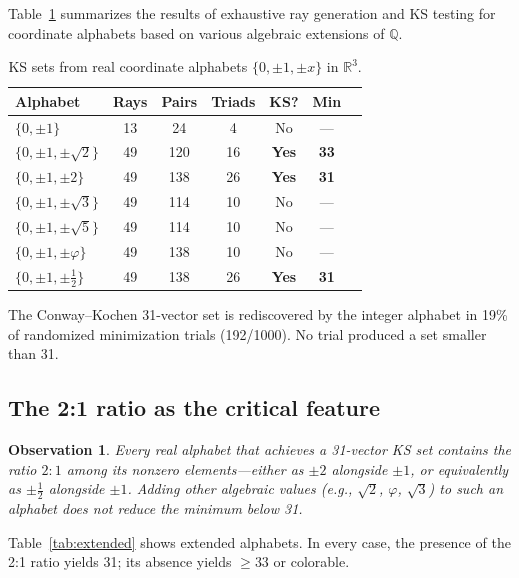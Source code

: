 \documentclass[12pt,a4paper]{article}
\newtheorem{observation}[theorem]{Observation}
\newcommand{\R}{\mathbb{R}}
\newcommand{\Q}{\mathbb{Q}}
\begin{document}
Table~\ref{tab:alphabets} summarizes the results of exhaustive ray generation and KS testing for coordinate alphabets based on various algebraic extensions of $\Q$.

\begin{table}[ht]
\centering
\caption{KS sets from real coordinate alphabets $\{0, \pm 1, \pm x\}$ in $\R^3$.}
\label{tab:alphabets}
\begin{tabular}{lcccccc}
\toprule
Alphabet & Rays & Pairs & Triads & KS? & Min \\
\midrule
$\{0, \pm 1\}$ & 13 & 24 & 4 & No & --- \\
$\{0, \pm 1, \pm\sqrt{2}\}$ & 49 & 120 & 16 & \textbf{Yes} & \textbf{33} \\
$\{0, \pm 1, \pm 2\}$ & 49 & 138 & 26 & \textbf{Yes} & \textbf{31} \\
$\{0, \pm 1, \pm\sqrt{3}\}$ & 49 & 114 & 10 & No & --- \\
$\{0, \pm 1, \pm\sqrt{5}\}$ & 49 & 114 & 10 & No & --- \\
$\{0, \pm 1, \pm\varphi\}$ & 49 & 138 & 10 & No & --- \\
$\{0, \pm 1, \pm\frac{1}{2}\}$ & 49 & 138 & 26 & \textbf{Yes} & \textbf{31} \\
\bottomrule
\end{tabular}
\end{table}

The Conway--Kochen 31-vector set is rediscovered by the integer alphabet in 19\% of randomized minimization trials (192/1000). No trial produced a set smaller than 31.

\subsection{The 2:1 ratio as the critical feature}\label{sec:ratio}

\begin{observation}
Every real alphabet that achieves a 31-vector KS set contains the ratio $2{:}1$ among its nonzero elements---either as $\pm 2$ alongside $\pm 1$, or equivalently as $\pm \frac{1}{2}$ alongside $\pm 1$. Adding other algebraic values (e.g., $\sqrt{2}$, $\varphi$, $\sqrt{3}$) to such an alphabet does not reduce the minimum below 31.
\end{observation}

Table~\ref{tab:extended} shows extended alphabets. In every case, the presence of the 2:1 ratio yields 31; its absence yields $\geq 33$ or colorable.
\end{document}
